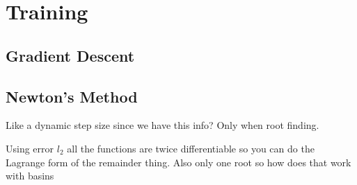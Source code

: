 
\chapter{Training}
\section{Gradient Descent}
\section{Newton's Method}
Like a dynamic step size since we have this info?
Only when root finding.

Using error $l_2$ all the functions are twice differentiable so you can do the Lagrange form of the remainder thing.
Also only one root so how does that work with basins 


